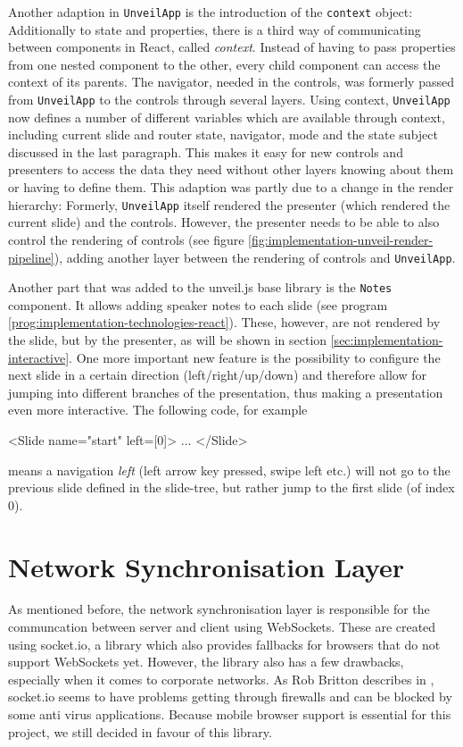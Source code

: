 Another adaption in \texttt{UnveilApp} is the introduction of the \texttt{context} object: Additionally to state and properties, there is a third way of communicating between components in React, called \emph{context}. Instead of having to pass properties from one nested component to the other, every child component can access the context of its parents. The navigator, needed in the controls, was formerly passed from \texttt{UnveilApp} to the controls through several layers. Using context, \texttt{UnveilApp} now defines a number of different variables which are available through context, including current slide and router state, navigator, mode and the state subject discussed in the last paragraph. This makes it easy for new controls and presenters to access the data they need without other layers knowing about them or having to define them.
This adaption was partly due to a change in the render hierarchy: Formerly, \texttt{UnveilApp} itself rendered the presenter (which rendered the current slide) and the controls. However, the presenter needs to be able to also control the rendering of controls (see figure \ref{fig:implementation-unveil-render-pipeline}), adding another layer between the rendering of controls and \texttt{UnveilApp}.

Another part that was added to the unveil.js base library is the \texttt{Notes} component. It allows adding speaker notes to each slide (see program \ref{prog:implementation-technologies-react}). These, however, are not rendered by the slide, but by the presenter, as will be shown in section \ref{sec:implementation-interactive}. One more important new feature is the possibility to configure the next slide in a certain direction (left/right/up/down) and therefore allow for jumping into different branches of the presentation, thus making a presentation even more interactive. The following code, for example
%
\begin{JsCode}
  <Slide name="start" left={[0]}>
    ...
  </Slide>
\end{JsCode}
%
means a navigation \emph{left} (left arrow key pressed, swipe left etc.) will not go to the previous slide defined in the slide-tree, but rather jump to the first slide (of index $0$).


\section{Network Synchronisation Layer}
\label{sec:implementation-network-sync}
As mentioned before, the network synchronisation layer is responsible for the communcation between server and client using WebSockets. These are created using socket.io, a library which also provides fallbacks for browsers that do not support WebSockets yet. However, the library also has a few drawbacks, especially when it comes to corporate networks. As Rob Britton describes in \cite{socketio-problems}, socket.io seems to have problems getting through firewalls and can be blocked by some anti virus applications.
Because mobile browser support is essential for this project, we still decided in favour of this library.

